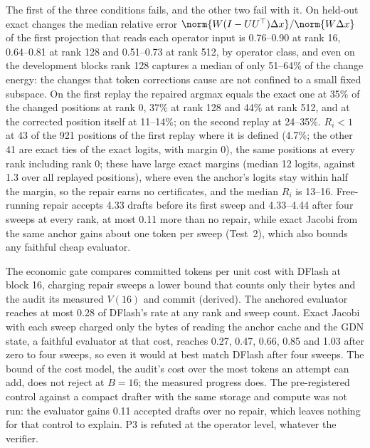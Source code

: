 The first of the three conditions fails, and the other two fail with it. On held-out exact changes the median relative error $\norm{W(I-UU^\top)\Delta x}/\norm{W\Delta x}$ of the first projection that reads each operator input is 0.76--0.90 at rank 16, 0.64--0.81 at rank 128 and 0.51--0.73 at rank 512, by operator class, and even on the development blocks rank 128 captures a median of only 51--64\% of the change energy: the changes that token corrections cause are not confined to a small fixed subspace. On the first replay the repaired argmax equals the exact one at 35\% of the changed positions at rank 0, 37\% at rank 128 and 44\% at rank 512, and at the corrected position itself at 11--14\%; on the second replay at 24--35\%. $R_i<1$ at 43 of the 921 positions of the first replay where it is defined (4.7\%; the other 41 are exact ties of the exact logits, with margin 0), the same positions at every rank including rank 0; these have large exact margins (median 12 logits, against 1.3 over all replayed positions), where even the anchor's logits stay within half the margin, so the repair earns no certificates, and the median $R_i$ is 13--16. Free-running repair accepts 4.33 drafts before its first sweep and 4.33--4.44 after four sweeps at every rank, at most 0.11 more than no repair, while exact Jacobi from the same anchor gains about one token per sweep (Test~2), which also bounds any faithful cheap evaluator.

The economic gate compares committed tokens per unit cost with DFlash at block 16, charging repair sweeps a lower bound that counts only their bytes and the audit its measured $V(16)$ and commit (derived). The anchored evaluator reaches at most 0.28 of DFlash's rate at any rank and sweep count. Exact Jacobi with each sweep charged only the bytes of reading the anchor cache and the GDN state, a faithful evaluator at that cost, reaches 0.27, 0.47, 0.66, 0.85 and 1.03 after zero to four sweeps, so even it would at best match DFlash after four sweeps. The bound of the cost model, the audit's cost over the most tokens an attempt can add, does not reject at $B=16$; the measured progress does. The pre-registered control against a compact drafter with the same storage and compute was not run: the evaluator gains 0.11 accepted drafts over no repair, which leaves nothing for that control to explain. P3 is refuted at the operator level, whatever the verifier.\label{sec:repair-verdict}

